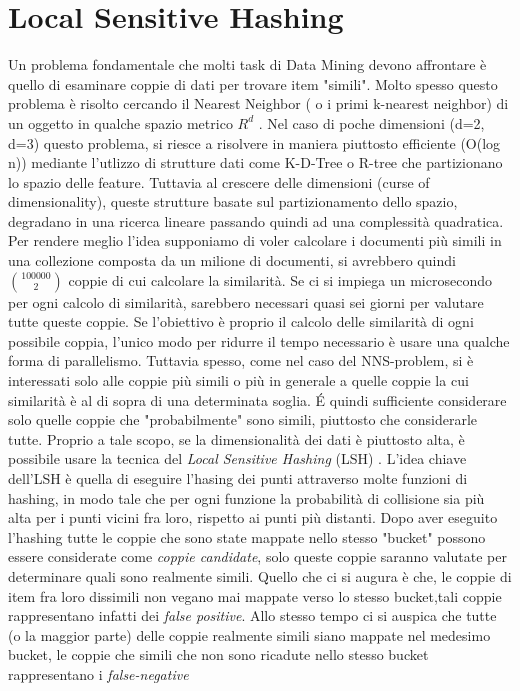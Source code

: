 \section{Local Sensitive Hashing}
Un problema fondamentale che molti task di Data Mining devono affrontare è quello di esaminare  coppie  di dati per trovare item "simili". Molto spesso questo problema è risolto cercando il Nearest Neighbor ( o i primi k-nearest neighbor) di un oggetto in qualche spazio metrico $R^d$ .
Nel caso di poche dimensioni (d=2, d=3) questo problema, si riesce a risolvere in maniera piuttosto efficiente (O(log n)) mediante l'utlizzo di strutture dati come K-D-Tree o R-tree che partizionano lo spazio delle feature. Tuttavia al crescere delle dimensioni (curse of dimensionality), queste strutture basate sul partizionamento dello spazio, degradano in una ricerca lineare \cite{Weber:1998:QAP:645924.671192} passando quindi ad una complessità quadratica.
Per rendere meglio l'idea supponiamo di voler calcolare i documenti più simili in una collezione composta da un milione di documenti, si avrebbero quindi  $\binom{100000}{2}$  coppie di cui calcolare la similarità. Se ci si impiega un microsecondo per ogni calcolo di similarità, sarebbero necessari quasi sei giorni per valutare tutte queste coppie.
Se l'obiettivo è proprio il calcolo delle similarità di ogni possibile coppia, l'unico modo per ridurre il tempo necessario è usare una qualche forma di parallelismo. Tuttavia spesso, come nel caso del NNS-problem, si è interessati solo alle coppie più simili o più in generale a quelle coppie la cui similarità è al di sopra di una determinata soglia. \'E quindi sufficiente considerare solo quelle coppie che "probabilmente" sono simili, piuttosto che considerarle tutte. Proprio a tale scopo, se la dimensionalità dei dati è piuttosto alta, è possibile usare la tecnica del \emph{Local Sensitive Hashing} (LSH) \cite{Lsh} \cite{Gionis:1999}. L'idea chiave dell'LSH è quella di eseguire l'hasing dei punti attraverso molte funzioni di hashing, in modo tale che per ogni funzione la probabilità di collisione sia più alta per i punti vicini fra loro, rispetto ai punti più distanti.
Dopo aver eseguito l'hashing  tutte le coppie che sono state mappate nello stesso "bucket" possono essere considerate come \emph{coppie candidate}, solo queste coppie saranno valutate per determinare quali sono realmente simili. Quello che ci si augura è che, le coppie di item fra loro dissimili non vegano mai mappate verso lo stesso bucket,tali coppie rappresentano infatti dei \emph{false positive}. Allo stesso tempo ci si auspica che tutte (o la maggior parte) delle coppie realmente simili siano mappate nel medesimo bucket, le coppie che simili che non sono ricadute nello stesso bucket rappresentano i \emph{false-negative}
